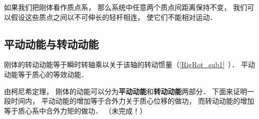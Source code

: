 
\begin{issues}
\issueDraft
\end{issues}


如果我们把刚体看作质点系， 那么系统中任意两个质点间距离保持不变， 我们可以假设这些质点之间以不可伸长的轻杆相连， 使它们不能相对运动．

\subsection{平动动能与转动动能}

刚体的转动动能等于瞬时转轴乘以关于该轴的转动惯量（\autoref{RigRot_sub1}~）． 平动动能等于质心的等效动能．

由柯尼希定理， 刚体的动能可以分为\textbf{平动动能}和\textbf{转动动能}两部分． 下面来证明一段时间内， 平动动能的增加等于合外力关于质心位移的做功， 而转动动能的增加等于质心系中合外力矩的做功．
（未完成！）


